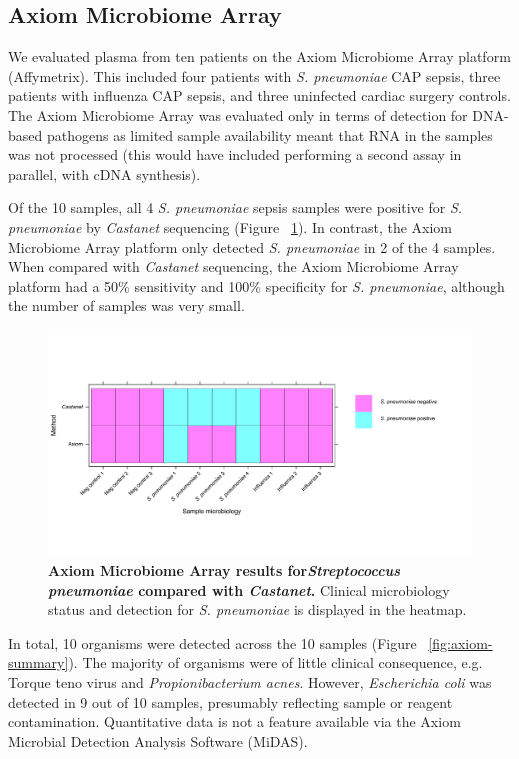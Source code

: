 \subsection{Axiom Microbiome Array}
We evaluated plasma from ten patients on the Axiom Microbiome Array platform (Affymetrix). This included four patients with \textit{S. pneumoniae} CAP sepsis, three patients with influenza CAP sepsis, and three uninfected cardiac surgery controls. The Axiom Microbiome Array was evaluated only in terms of detection for DNA-based pathogens as limited sample availability meant that RNA in the samples was not processed (this would have included performing a second assay in parallel, with cDNA synthesis). 

Of the 10 samples, all 4 \textit{S. pneumoniae} sepsis samples were positive for \textit{S. pneumoniae} by \textit{Castanet} sequencing (Figure ~\ref{fig:axiom}). In contrast, the Axiom Microbiome Array platform only detected \textit{S. pneumoniae} in 2 of the 4 samples. When compared with \textit{Castanet} sequencing, the Axiom Microbiome Array platform had a 50\% sensitivity and 100\% specificity for \textit{S. pneumoniae}, although the number of samples was very small.

\FloatBarrier
\begin{figure}[htbp]
\centering
\includegraphics[scale=0.6]{./Results2/Images/Axiom.pdf}
\caption[Axiom Microbiome Array results for \textit{Streptococcus pneumoniae}]{\textbf{Axiom Microbiome Array results for\textit{Streptococcus pneumoniae} compared with \textit{Castanet}.} Clinical microbiology status and detection for \textit{S. pneumoniae} is displayed in the heatmap.}
\label{fig:axiom}
\end{figure}

In total, 10 organisms were detected across the 10 samples (Figure ~\ref{fig:axiom-summary}). The majority of organisms were of little clinical consequence, e.g. Torque teno virus and \textit{Propionibacterium acnes}. However, \textit{Escherichia coli} was detected in 9 out of 10 samples, presumably reflecting sample or reagent contamination. Quantitative data is not a feature available via the Axiom Microbial Detection Analysis Software (MiDAS). 



